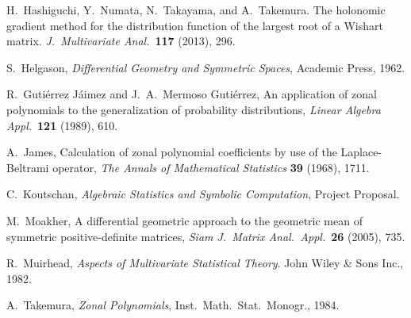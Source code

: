 \documentclass[10pt,oneside,american]{amsart}
\numberwithin{equation}{section}
\numberwithin{figure}{section}
\theoremstyle{definition}
\theoremstyle{remark}
\theoremstyle{plain}
\theoremstyle{definition}
\theoremstyle{plain}
\begin{document}
\begin{thebibliography}{1}
H.~Hashiguchi, Y.~Numata, N.~Takayama, and A.~Takemura.
The holonomic gradient method for the distribution function of the
largest root of a Wishart matrix. \emph{J.~Multivariate Anal.}~\textbf{117}
(2013), 296.

S.~Helgason, \emph{Differential Geometry and Symmetric
Spaces}, Academic Press, 1962.

R.~Guti\'{e}rrez J\'{a}imez and J.~A.~Mermoso
Guti\'{e}rrez, An application of zonal polynomials to the generalization
of probability distributions, \emph{Linear Algebra Appl.}~\textbf{121}
(1989), 610.

A.~James, Calculation of zonal polynomial coefficients
by use of the Laplace-Beltrami operator, \emph{The Annals of Mathematical
Statistics} \textbf{39} (1968), 1711.

C.~Koutschan, \emph{Algebraic Statistics and Symbolic
Computation}, Project Proposal. 

M.~Moakher, A differential geometric approach to
the geometric mean of symmetric positive-definite matrices, \emph{Siam
J.~Matrix Anal.~Appl.}~\textbf{26} (2005), 735.

R.~Muirhead, \emph{Aspects of Multivariate Statistical
Theory}. John Wiley \& Sons Inc., 1982.

A.~Takemura, \emph{Zonal Polynomials}, Inst.~Math.~Stat.~Monogr.,
1984.
\end{thebibliography}
\end{document}
